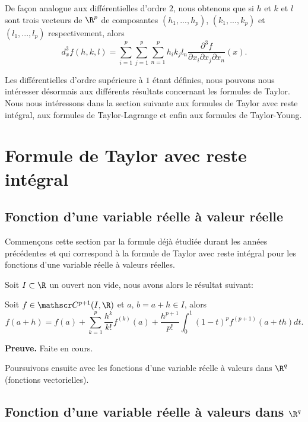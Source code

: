 \documentclass[class=report,crop=false]{standalone}
\begin{document}
\noindent De façon analogue aux différentielles d'ordre $2$, nous obtenons que si $h$ et $k$ et $l$ sont trois vecteurs de $\R^p$ de composantes $(h_1,...,h_p)$, $(k_1,...,k_p)$ et $(l_1,...,l_p)$
respectivement, alors
\begin{equation*}
  d^3_xf(h,k,l)= \displaystyle \sum_{i=1}^p   \displaystyle \sum_{j=1}^p  \displaystyle \sum_{n=1}^p h_ik_j  l_n \dfrac{\partial^3 f}{\partial x_i \partial x_j \partial x_n}(x).
\end{equation*}



\noindent Les différentielles d'ordre supérieure à $1$ étant définies, nous pouvons nous intéresser désormais aux différents résultats
concernant les formules de Taylor. Nous nous intéressons dans la section suivante aux formules de Taylor avec reste intégral, 
aux formules de Taylor-Lagrange et enfin aux formules de Taylor-Young. 

\section{Formule de Taylor avec reste int\'egral}
\subsection{Fonction d'une variable r\'eelle \`a valeur r\'eelle}

\noindent Commençons cette section par la formule déjà étudiée durant les années précédentes et qui correspond à la formule de Taylor avec
reste intégral pour les fonctions d'une variable réelle à valeurs réelles.

\noindent Soit $I \subset \R$ un ouvert non vide, nous avons alors le résultat suivant:

\begin{theoreme}
\textcolor[rgb]{0.44,0.00,0.87}{
  Soit $f \in \co^{p+1}(I, \R)$ et $a$, $b=a+h \in I$, alors
  \begin{equation*}
    f(a+h)=f(a)+\displaystyle \sum_{k=1}^p \dfrac{h^k}{k!}f^{(k)}(a)+\dfrac{h^{p+1}}{p!}\displaystyle \int_0^1(1-t)^p f^{(p+1)}(a+th)dt.
  \end{equation*}}
\end{theoreme}

{\textbf{Preuve.}} Faite en cours.


\noindent Poursuivons ensuite avec les fonctions d'une variable réelle à valeurs dans $\R^q$ (fonctions vectorielles). 
\subsection{Fonction d'une variable r\'eelle \`a valeurs dans $\R^q$}
\end{document}
